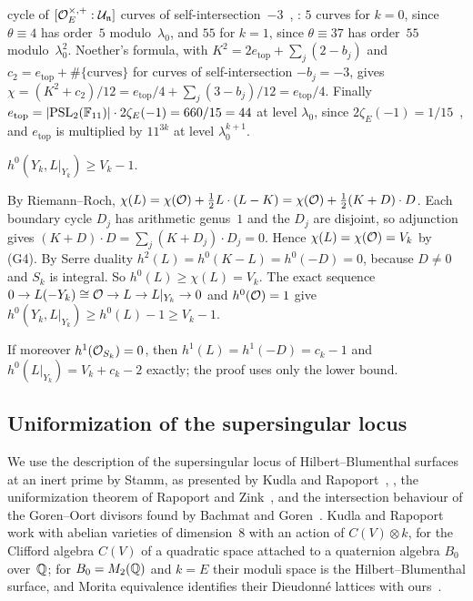 \begin{itemize}
cycle of $[\mathcal{O}_E^{\times,+}:\mathcal U_{\mathfrak n}]$ curves of self-intersection~$-3$~\cite[Sections~2.5 and~2.6]{Hirzebruch1973},
\cite{vanderGeer1988}:
$5$ curves for $k=0$, since $\theta\equiv4$ has order~$5$ modulo~$\lambda_0$, and $55$ for $k=1$, since $\theta\equiv37$ has
order~$55$ modulo~$\lambda_0^2$. Noether's formula, with $K^2=2e_{\mathrm{top}}+\sum_j(2-b_j)$ and
$c_2=e_{\mathrm{top}}+\#\{\text{curves}\}$ for curves of self-intersection $-b_j=-3$, gives
$\chi=(K^2+c_2)/12=e_{\mathrm{top}}/4+\sum_j(3-b_j)/12=e_{\mathrm{top}}/4$. Finally $e_{\mathrm{top}}=\lvert \operatorname{PSL}_2(\mathbb{F}_{11}) \rvert\cdot
2\zeta_E(-1)=660/15=44$ at level $\lambda_0$, since $2\zeta_E(-1)=1/15$~\cite[Sections~1.6 and~1.7]{Hirzebruch1973}, and $e_{\mathrm{top}}$ is multiplied by $11^{3k}$ at
level $\lambda_0^{k+1}$.
\end{itemize}

\begin{lemma}\label{lem:RR}
\notformalized
$h^0(Y_k,L|_{Y_k})\ge V_k-1$.
\end{lemma}
\begin{informalproof}
By Riemann--Roch, $\chi(L)=\chi(\mathcal{O})+\frac12L\cdot(L-K)=\chi(\mathcal{O})+\frac12(K+D)\cdot D$. Each boundary cycle $D_j$ has
arithmetic genus~$1$ and the $D_j$ are disjoint, so adjunction gives $(K+D)\cdot D=\sum_j(K+D_j)\cdot D_j=0$. Hence
$\chi(L)=\chi(\mathcal{O})=V_k$ by (G4). By Serre duality $h^2(L)=h^0(K-L)=h^0(-D)=0$, because $D\ne0$ and $S_k$ is integral.
So $h^0(L)\ge\chi(L)=V_k$. The exact sequence $0\to L(-Y_k)\cong\mathcal{O}\to L\to L|_{Y_k}\to0$ and $h^0(\mathcal{O})=1$ give
$h^0(Y_k,L|_{Y_k})\ge h^0(L)-1\ge V_k-1$.
\end{informalproof}

If moreover $h^1(\mathcal{O}_{S_k})=0$, then $h^1(L)=h^1(-D)=c_k-1$ and $h^0(L|_{Y_k})=V_k+c_k-2$ exactly; the proof uses only the
lower bound.

\subsection{Uniformization of the supersingular locus}\label{sec:uniformization}

We use the description of the supersingular locus of Hilbert--Blumenthal surfaces at an inert prime by Stamm, as
presented by Kudla and Rapoport~\cite[Section~4]{KudlaRapoport1999}, \cite{Stamm1997}, the uniformization theorem of
Rapoport and Zink~\cite[Theorem~6.30]{RapoportZink1996}, and the intersection behaviour of the Goren--Oort divisors found
by Bachmat and Goren~\cite[Theorem~6.1]{BachmatGoren1999}. Kudla and Rapoport work with abelian varieties of
dimension~$8$ with an action of $C(V)\otimes k$, for the Clifford algebra $C(V)$ of a quadratic space attached to a
quaternion algebra $B_0$ over~$\mathbb{Q}$; for $B_0=M_2(\mathbb{Q})$ and $k=E$ their moduli space is the Hilbert--Blumenthal surface,
and Morita equivalence identifies their Dieudonn\'e lattices with ours~\cite[Introduction and Section~3]{KudlaRapoport1999}.

